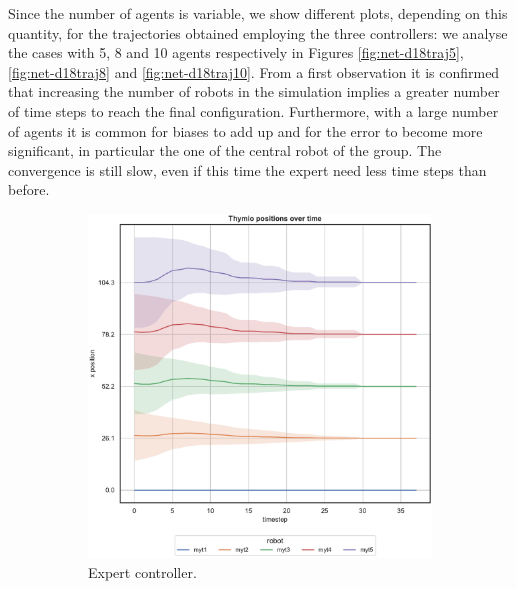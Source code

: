 Since the number of agents is variable, we show different plots, depending on this 
quantity, for the trajectories obtained employing the three controllers: we analyse 
the cases with 5, 8 and 10 agents respectively in Figures \ref{fig:net-d18traj5}, 
\ref{fig:net-d18traj8} and \ref{fig:net-d18traj10}. 
From a first observation it is confirmed that increasing the number of robots in 
the simulation implies a greater number of time steps to reach the final 
configuration.
Furthermore, with a large number of agents it is common for biases to add up 
and for the error to become more significant, in particular the one of the central 
robot of the group.
The convergence is still slow, even if this time the expert need less time steps than 
before. 
\begin{figure}[!htb]
	\begin{center}
		\begin{subfigure}[h]{0.325\textwidth}
			\centering
			\includegraphics[width=\textwidth]{contents/images/net-d18/N5/position-overtime-omniscient}%
			\caption{Expert controller.}
		\end{subfigure}
		\hfill
		\begin{subfigure}[h]{0.325\textwidth}
			\centering

\end{subfigure}
\end{center}
\end{figure}
